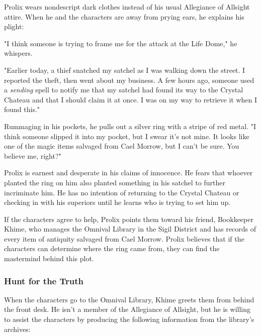 \documentclass[10pt,a4paper,twoside,fancy,bg=print,twocolumn,openany,nodeprecatedcode]{dndbook}
\begin{document}
Prolix wears nondescript dark clothes instead of his usual Allegiance of Allsight attire. When he and the characters are away from prying ears, he explains his plight:

\begin{DndReadAloud}{}
"I think someone is trying to frame me for the attack at the Life Dome," he whispers.

"Earlier today, a thief snatched my satchel as I was walking down the street. I reported the theft, then went about my business. A few hours ago, someone used a \textit{sending} spell to notify me that my satchel had found its way to the Crystal Chateau and that I should claim it at once. I was on my way to retrieve it when I found this."

Rummaging in his pockets, he pulls out a silver ring with a stripe of red metal. "I think someone slipped it into my pocket, but I swear it's not mine. It looks like one of the magic items salvaged from Cael Morrow, but I can't be sure. You believe me, right?"

\end{DndReadAloud}

Prolix is earnest and desperate in his claims of innocence. He fears that whoever planted the ring on him also planted something in his satchel to further incriminate him. He has no intention of returning to the Crystal Chateau or checking in with his superiors until he learns who is trying to set him up.

If the characters agree to help, Prolix points them toward his friend, Bookkeeper Khime, who manages the Omnival Library in the Sigil District and has records of every item of antiquity salvaged from Cael Morrow. Prolix believes that if the characters can determine where the ring came from, they can find the mastermind behind this plot.

\subsubsection{Hunt for the Truth}
When the characters go to the Omnival Library, Khime greets them from behind the front desk. He isn't a member of the Allegiance of Allsight, but he is willing to assist the characters by producing the following information from the library's archives:
\end{document}
